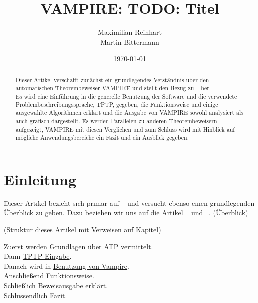 \documentclass{acm_proc_article-sp-german}
\begin{document}
\title{VAMPIRE: TODO: Titel}
\author{
	\alignauthor
	Maximilian Reinhart\\
	\alignauthor
	Martin Bittermann\\
}

\date{\today}

\maketitle

\begin{abstract}
Dieser Artikel verschafft zunächst ein grundlegendes Verständnis über den automatischen Theorembeweiser VAMPIRE und
stellt den Bezug zu ~\cite{cav2013} her. \\
Es wird eine Einführung in die generelle Benutzung der Software und die verwendete Problembeschreibungssprache, TPTP, gegeben, 
die Funktionsweise und einige ausgewählte Algorithmen erklärt und
die Ausgabe von VAMPIRE sowohl analysiert als auch grafisch dargestellt.
Es werden Parallelen zu anderen Theorembeweisern aufgezeigt, VAMPIRE mit diesen Verglichen 
und zum Schluss wird mit Hinblick auf mögliche Anwendungsbereiche ein Fazit und ein Ausblick gegeben.
\end{abstract}


\section{Einleitung}
\label{sec:introduction}


Dieser Artikel bezieht sich primär auf ~\cite{cav2013} und versucht ebenso einen grundlegenden Überblick zu geben.
Dazu beziehen wir uns auf die Artikel ~\cite{hoder2010} und ~\cite{kovacs2009finding}.
(Überblick) 

(Struktur dieses Artikel mit Verweisen auf Kapitel)

Zuerst werden \hyperref[sec:foundations]{Grundlagen} über ATP vermittelt.\\
Dann \hyperref[sec:input]{TPTP Eingabe}.\\
Danach wird in \hyperref[sec:invocation]{Benutzung von Vampire}.\\
Anschließend \hyperref[sec:mechanics]{Funktionsweise}.\\
Schließlich \hyperref[sec:output]{Beweisausgabe} erklärt.\\
Schlussendlich \hyperref[sec:conclusion]{Fazit}.
\end{document}
